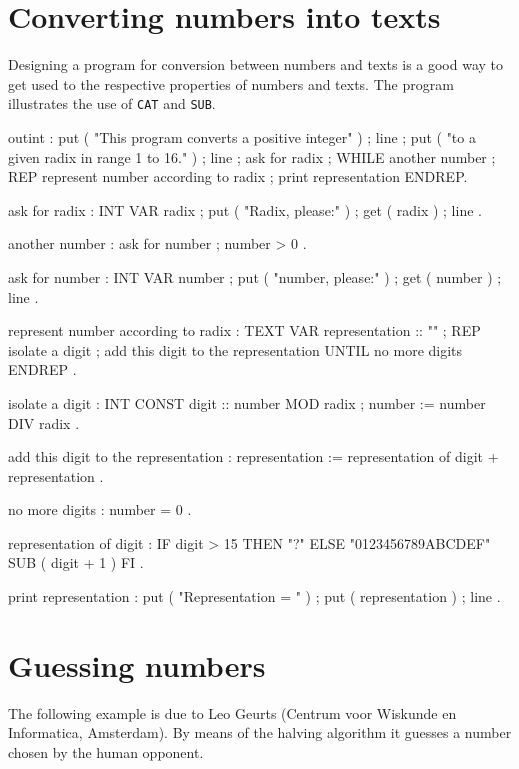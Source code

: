 \section{Converting numbers into texts}

Designing a program for conversion between numbers and texts
is a good way to get used to the respective properties of numbers
and texts. The program illustrates the use of {\tt CAT} and {\tt SUB}.

\begin{elan}
outint :
  put ( "This program converts a positive integer" ) ;
  line ;
  put ( "to a given radix in range 1 to 16." ) ;
  line ;
  ask for radix ;
  WHILE
    another number ;
  REP
    represent number according to radix ;
    print representation
  ENDREP.

ask for radix :
  INT VAR radix ;
  put ( "Radix, please:" ) ;
  get ( radix ) ;
  line .

another number :
  ask for number ;
  number > 0 .

ask for number :
  INT VAR number ;
  put ( "number, please:" ) ;
  get ( number ) ;
  line .

represent number according to radix :
  TEXT VAR representation :: "" ;
  REP
    isolate a digit ;
    add this digit to the representation
  UNTIL
    no more digits
  ENDREP .

isolate a digit :
  INT CONST digit :: number MOD radix ;
  number := number DIV radix .

add this digit to the representation :
  representation := representation of digit + representation .

no more digits :
  number = 0 .

representation of digit :
   IF digit > 15
   THEN "?"
   ELSE "0123456789ABCDEF" SUB ( digit + 1 )
   FI .

print representation :
    put ( "Representation = " ) ;
    put ( representation ) ;
    line .
\end{elan}

\section{Guessing numbers}

The following example is due to Leo Geurts (Centrum voor Wiskunde
en Informatica, Amsterdam). By means of the halving algorithm
it guesses a number chosen by the human opponent.

